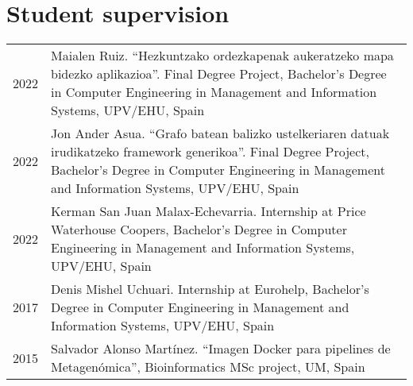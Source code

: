\documentclass[11pt,fullpage]{article}
\begin{document}
\section*{Student supervision}

\begin{longtable}{p{0.5in}|p{5.5in}}

2022 & Maialen Ruiz. ``Hezkuntzako ordezkapenak aukeratzeko mapa bidezko aplikazioa''. Final Degree Project, Bachelor's Degree in Computer Engineering in Management and Information Systems, UPV/EHU, Spain \\
2022 & Jon Ander Asua. ``Grafo batean balizko ustelkeriaren datuak irudikatzeko framework generikoa''. Final Degree Project, Bachelor's Degree in Computer Engineering in Management and Information Systems, UPV/EHU, Spain \\
2022 & Kerman San Juan Malax-Echevarria. Internship at Price Waterhouse Coopers, Bachelor's Degree in Computer Engineering in Management and Information Systems, UPV/EHU, Spain  \\
2017 & Denis Mishel Uchuari. Internship at Eurohelp, Bachelor's Degree in Computer Engineering in Management and Information Systems, UPV/EHU, Spain \\
2015 & Salvador Alonso Mart\'inez. ``Imagen Docker para pipelines de Metagen\'omica'', Bioinformatics MSc project, UM, Spain \\


\end{longtable}
\end{document}
